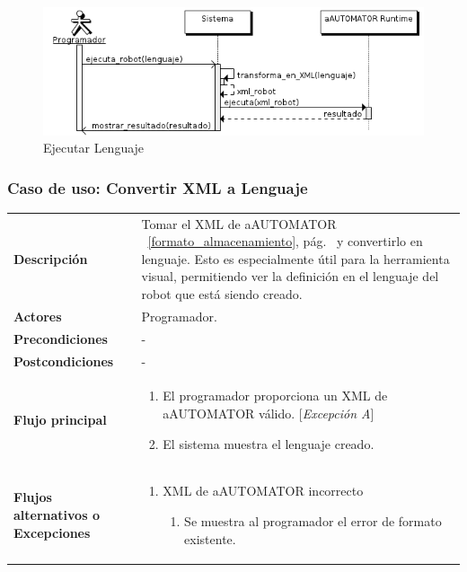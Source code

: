 \begin{figure}[bp!]
  \includegraphics[totalheight=.2\textheight]{chapters/technical-manual/diagrams/sequence/ejecutar_lenguaje.png}
\caption{Ejecutar Lenguaje}\label{ejecutar_lenguaje}
\end{figure}
\clearpage

\subsubsection{\large{Caso de uso: Convertir XML a Lenguaje}}

\begin{tabular}[h]{ p{ } p{ }}

\textbf{Descripción} & Tomar el XML de aAUTOMATOR
~\ref{formato_almacenamiento}, pág.~\pageref{formato_almacenamiento}
y convertirlo en lenguaje. Esto es especialmente útil para la
herramienta visual, permitiendo ver la definición en el lenguaje del
robot que está siendo creado.\\[3mm]

\textbf{Actores} & Programador.\\[3mm]

\textbf{Precondiciones} & - \\[3mm]

\textbf{Postcondiciones} & - \\[3mm]

\textbf{Flujo principal} & \begin{enumerate}[leftmargin=1em,topsep=0pt, partopsep=0pt]
  \item El programador proporciona un XML de aAUTOMATOR válido. [\emph{Excepción A}]
  \item El sistema muestra el lenguaje creado.
\end{enumerate}\\[3mm]

\textbf{Flujos alternativos o Excepciones} &
\begin{enumerate}[label=\Alph*:,leftmargin=1em,topsep=0pt, partopsep=0pt]
\item XML de aAUTOMATOR incorrecto
  \begin{enumerate}[label=\arabic*.,topsep=0pt, partopsep=0pt]
    \item Se muestra al programador el error de formato existente.
  \end{enumerate}
\end{enumerate}\\[3mm]
\end{tabular}

